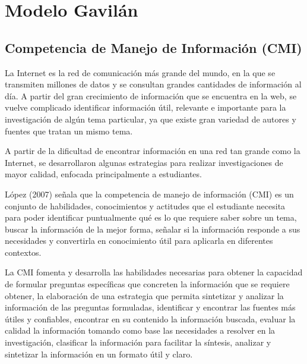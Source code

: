 
\chapter{Modelo Gavilán}
\label{capII}



\section{Competencia de Manejo de Información (CMI)}
\label{secCMICap2}

La Internet es la red de comunicación más grande del mundo, en la que se transmiten millones de datos y se consultan grandes cantidades de información al día. A partir del gran crecimiento de información que se encuentra en la web, se vuelve complicado identificar información útil, relevante e importante para la investigación de algún tema particular, ya que existe gran variedad de autores y fuentes que tratan un mismo tema.

A partir de la dificultad de encontrar información en una red tan grande como la Internet, se desarrollaron algunas estrategias para realizar investigaciones de mayor calidad, enfocada principalmente a estudiantes.

López (2007) señala que la competencia de manejo de información (CMI) es un conjunto de habilidades, conocimientos y actitudes que el estudiante necesita para poder identificar puntualmente qué es lo que requiere saber sobre un tema, buscar la información de la mejor forma, señalar si la información responde a sus necesidades y convertirla en conocimiento útil para aplicarla en diferentes contextos.

La CMI fomenta y desarrolla las habilidades necesarias para obtener la capacidad de formular preguntas específicas que concreten la información que se requiere obtener, la elaboración de una estrategia que permita sintetizar y analizar la información de las preguntas formuladas, identificar y encontrar las fuentes más útiles y confiables, encontrar en su contenido la información buscada, evaluar la calidad la información tomando como base las necesidades a resolver en la investigación, clasificar la información para facilitar la síntesis, analizar y sintetizar la información en un formato útil y claro.

